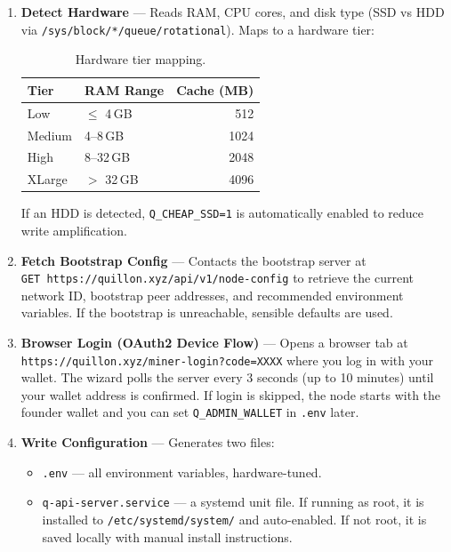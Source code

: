 \documentclass[11pt,a4paper]{article}
\begin{document}
\begin{enumerate}
    \item \textbf{Detect Hardware} --- Reads RAM, CPU cores, and disk type
          (SSD vs HDD via \texttt{/sys/block/*/queue/rotational}).
          Maps to a hardware tier:

    \begin{table}[H]
    \centering
    \begin{tabular}{@{}llr@{}}
    \toprule
    \textbf{Tier} & \textbf{RAM Range} & \textbf{Cache (MB)} \\
    \midrule
    Low    & $\leq$ 4\,GB    & 512 \\
    Medium & 4--8\,GB        & 1024 \\
    High   & 8--32\,GB       & 2048 \\
    XLarge & $>$ 32\,GB      & 4096 \\
    \bottomrule
    \end{tabular}
    \caption{Hardware tier mapping.}
    \end{table}

    If an HDD is detected, \texttt{Q\_CHEAP\_SSD=1} is automatically enabled
    to reduce write amplification.

    \item \textbf{Fetch Bootstrap Config} --- Contacts the bootstrap server at\\
          \texttt{GET https://quillon.xyz/api/v1/node-config} to retrieve
          the current network ID, bootstrap peer addresses, and recommended
          environment variables. If the bootstrap is unreachable, sensible
          defaults are used.

    \item \textbf{Browser Login (OAuth2 Device Flow)} --- Opens a browser tab at\\
          \texttt{https://quillon.xyz/miner-login?code=XXXX} where you log in
          with your wallet. The wizard polls the server every 3 seconds (up to
          10 minutes) until your wallet address is confirmed. If login is
          skipped, the node starts with the founder wallet and you can set
          \texttt{Q\_ADMIN\_WALLET} in \texttt{.env} later.

    \item \textbf{Write Configuration} --- Generates two files:
    \begin{itemize}[nosep]
        \item \texttt{.env} --- all environment variables, hardware-tuned.
        \item \texttt{q-api-server.service} --- a systemd unit file.
              If running as root, it is installed to
              \texttt{/etc/systemd/system/} and auto-enabled.
              If not root, it is saved locally with manual install instructions.
    \end{itemize}
\end{enumerate}
\end{document}
